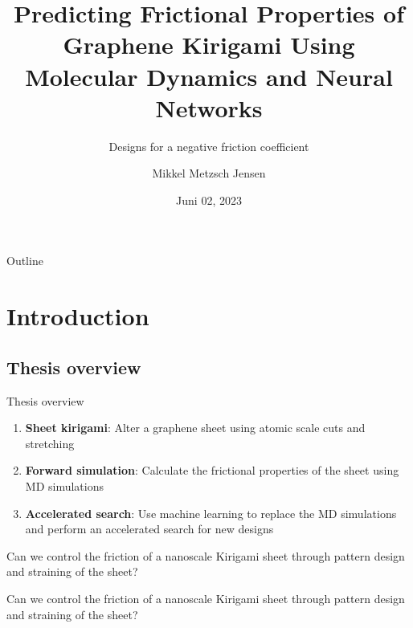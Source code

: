 \documentclass[
	10pt, %
]{beamer}
\title[Predicting Graphene Kirigami Friction]{Predicting Frictional Properties of Graphene Kirigami Using Molecular Dynamics and Neural Networks}
\subtitle{Designs for a negative friction coefficient}
\author[Mikkel Metzsch Jensen]{Mikkel Metzsch Jensen}
\institute[UiO]{University of Oslo}
\date[Juni 02, 2023]{Juni 02, 2023}
\begin{document}

\begin{frame}
	\titlepage %
\end{frame}


\begin{frame}{Outline}
    \tableofcontents
\end{frame}
%
%
\section{Introduction} %
\subsection{Thesis overview}
\begin{frame}{Thesis overview}
	\begin{enumerate}
		\setlength\itemsep{1em}
		\item \textbf{Sheet kirigami}: Alter a graphene sheet using atomic scale cuts and stretching
		\item \textbf{Forward simulation}: Calculate the frictional properties of the sheet using MD simulations
		\item \textbf{Accelerated search}: Use machine learning to replace the MD simulations and perform an accelerated search for new designs
	\end{enumerate}
	\vspace{2mm}
	
	Can we control the friction of a nanoscale Kirigami sheet through pattern design and straining of the sheet?

	\begin{alertblock}{}
        Can we control the friction of a nanoscale Kirigami sheet through pattern design and straining of the sheet?
    \end{alertblock}

	
\end{frame}
%
%
\end{document}
